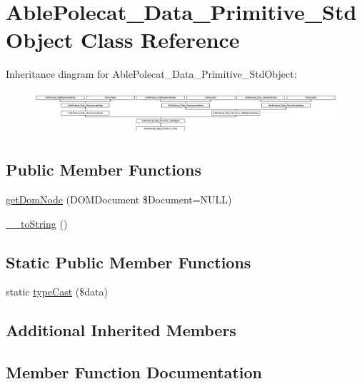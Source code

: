 \hypertarget{class_able_polecat___data___primitive___std_object}{}\section{Able\+Polecat\+\_\+\+Data\+\_\+\+Primitive\+\_\+\+Std\+Object Class Reference}
\label{class_able_polecat___data___primitive___std_object}
Inheritance diagram for Able\+Polecat\+\_\+\+Data\+\_\+\+Primitive\+\_\+\+Std\+Object\+:\begin{figure}[H]
\begin{center}
\leavevmode
\includegraphics[height=1.620370cm]{class_able_polecat___data___primitive___std_object}
\end{center}
\end{figure}
\subsection*{Public Member Functions}
\begin{DoxyCompactItemize}
\item 
\hyperlink{class_able_polecat___data___primitive___std_object_a3241c66cb1cbb7b720be191808876012}{get\+Dom\+Node} (D\+O\+M\+Document \$Document=N\+U\+L\+L)
\item 
\hyperlink{class_able_polecat___data___primitive___std_object_a7516ca30af0db3cdbf9a7739b48ce91d}{\+\_\+\+\_\+to\+String} ()
\end{DoxyCompactItemize}
\subsection*{Static Public Member Functions}
\begin{DoxyCompactItemize}
\item 
static \hyperlink{class_able_polecat___data___primitive___std_object_a68640750b79d1cdda3cddcece68a207e}{type\+Cast} (\$data)
\end{DoxyCompactItemize}
\subsection*{Additional Inherited Members}


\subsection{Member Function Documentation}
\hypertarget{class_able_polecat___data___primitive___std_object_a7516ca30af0db3cdbf9a7739b48ce91d}{}
